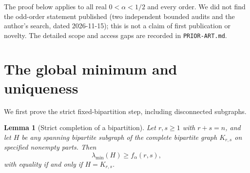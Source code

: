 \documentclass[11pt]{amsart}
\newtheorem{lemma}[theorem]{Lemma}
\theoremstyle{definition}
\newcommand{\lam}{\lambda_{\min}}
\begin{document}
The proof below applies to all real $0<\alpha<1/2$ and every order. We did not find the odd-order statement published (two independent bounded audits and the author's search, dated 2026-11-15); this is not a claim of first publication or novelty. The detailed scope and access gaps are recorded in \texttt{PRIOR-ART.md}.

\section{The global minimum and uniqueness}
We first prove the strict fixed-bipartition step, including disconnected subgraphs.

\begin{lemma}[Strict completion of a bipartition]\label{lem:completion}
Let $r,s\ge1$ with $r+s=n$, and let $H$ be any spanning bipartite subgraph of the complete bipartite graph $K_{r,s}$ on specified nonempty parts. Then
\[
 \lam(H)\ge f_\alpha(r,s),
\]
with equality if and only if $H=K_{r,s}$.
\end{lemma}
\end{document}
